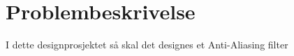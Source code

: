 \clearpage
\section{Problembeskrivelse}
\label{problemBeskrivelse}



I dette designprosjektet så skal det designes et Anti-Aliasing filter